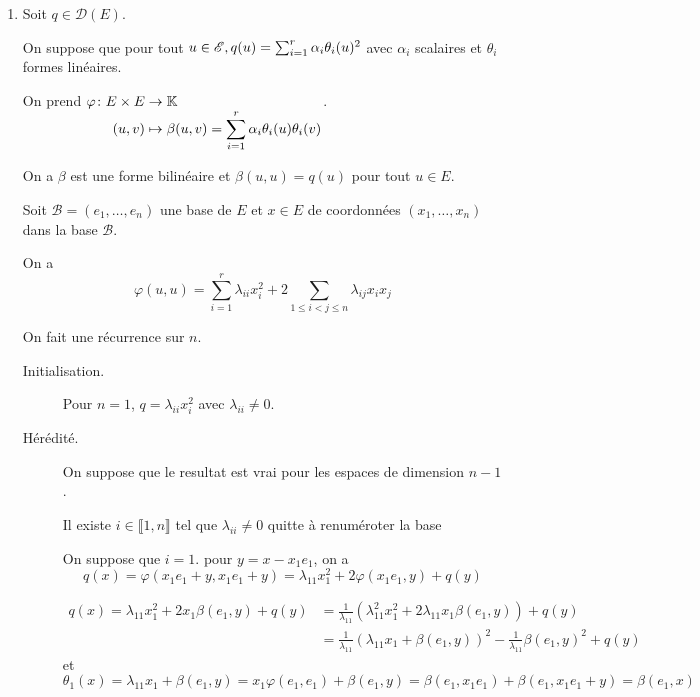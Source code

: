\documentclass[a4paper, 12pt]{article}
\begin{document}
\begin{demonstration}
    \begin{enumerate}
        \item
        Soit $q \in \mathcal{D}(E)$.

        On suppose que pour tout $u \in \mathscr{E}, q(u) = \sum_{i=1}^r \alpha_i \theta_i(u)^2$ avec $\alpha_i$ scalaires et $\theta_i$ formes linéaires.

        On prend $\funcdef{\varphi}{E \times E}{\K}{(u, v)}{\beta(u, v) = \sum_{i=1}^r \alpha_i \theta_i(u) \theta_i(v)}$.

        On a $\beta$ est une forme bilinéaire et $\beta(u, u) = q(u)$ pour tout $u \in E$.

        Soit $\mathcal{B} = (e_1, \ldots, e_n)$ une base de $E$ et $x \in E$ de coordonnées $(x_1, \ldots, x_n)$ dans la base $\mathcal{B}$.

        On a
        $$
        \varphi(u, u) = \sum_{i=1}^r \lambda_{ii} x_i^2 + 2 \sum_{1 \leq i < j \leq n} \lambda_{ij} x_i x_j
        $$

        On fait une récurrence sur $n$.
        \begin{description}
            \item[Initialisation.]
            Pour $n = 1$, $q = \lambda_{ii} x_i^2$ avec $\lambda_{ii} \neq 0$.
            \item[Hérédité.]  
            On suppose que le resultat est vrai pour les espaces de dimension $n-1$.

            Il existe $i \in \llbracket 1, n \rrbracket$ tel que $\lambda_{ii} \neq 0$ quitte à renuméroter la base

            On suppose que $i = 1$. pour $y = x - x_1 e_1$, on a
            $$
            q(x) = \varphi(x_1 e_1 + y, x_1 e_1 + y) = \lambda_{11} x_1^2 + 2 \varphi(x_1 e_1, y) + q(y)
            $$

            \begin{align*}
                q(x) = \lambda_{11} x_1^2 + 2 x_1 \beta(e_1, y) + q(y) &= \frac{1}{\lambda_{11}} \left( \lambda_{11}^2 x_1^2 + 2 \lambda_{11} x_1 \beta(e_1, y) \right) + q(y) \\
                &= \frac{1}{\lambda_{11}} \left( \lambda_{11} x_1 + \beta(e_1, y) \right)^2 - \frac{1}{\lambda_{11}} \beta(e_1, y)^2 + q(y)
            \end{align*}
            et
            $$
            \theta_1(x) = \lambda_{11} x_1 + \beta(e_1, y) = x_1 \varphi(e_1, e_1) + \beta(e_1, y) = \beta(e_1, x_1 e_1) + \beta(e_1, x_1e_1 + y) = \beta(e_1, x)
            $$


\end{description}
\end{enumerate}
\end{demonstration}
\end{document}
